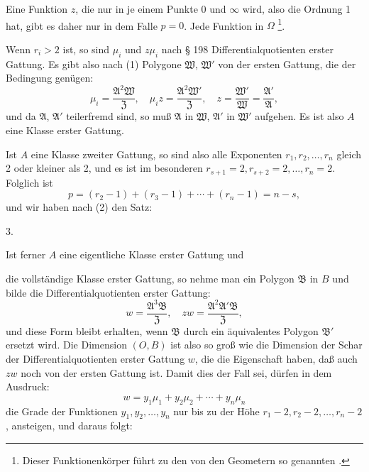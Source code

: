 Eine Funktion $z$, die nur in je einem Punkte 0 und $\infty$ wird,
also die Ordnung 1 hat, gibt es daher nur in dem Falle $p = 0$.
Jede Funktion in $\Omega$ %
\footnote{Dieser Funktionenkörper führt zu den von den Geometern so
genannten \glqq {}\grqq{}.}.

Wenn $r_i > 2$ ist, so sind $\mu_i$ und $z\mu_i$ nach § 198 Differentialquotienten
 erster Gattung. Es gibt also nach (1) Polygone $\mathfrak{W}$, $\mathfrak{W}'$
von der ersten Gattung, die der Bedingung genügen:
\[
\mu_i = \frac{\mathfrak{A}^2\mathfrak{W}}{\mathfrak{Z}},\quad \mu_i z = \frac{\mathfrak{A}^2\mathfrak{W}'}{\mathfrak{Z}},\quad z = \frac{\mathfrak{W}'}{\mathfrak{W}} = \frac{\mathfrak{A}'}{\mathfrak{A}},
\]
und da $\mathfrak{A}$, $\mathfrak{A}'$ teilerfremd sind, so muß $\mathfrak{A}$ in $\mathfrak{W}$, $\mathfrak{A}'$ in $\mathfrak{W}'$ aufgehen.
Es ist also $A$ eine Klasse erster Gattung.

Ist $A$ eine Klasse zweiter Gattung, so sind also alle Exponenten
 $r_1, r_2, \ldots, r_n$ gleich 2 oder kleiner als 2, und es ist im
besonderen $r_{s+1}=2, r_{s+2}=2, \ldots, r_n=2$. Folglich ist
\[
p = (r_2-1)+(r_3-1)+\cdots+(r_n-1) = n-s,
\]
und wir haben nach (2) den Satz:

3. 


Ist ferner $A$ eine eigentliche Klasse erster Gattung und


die vollständige Klasse erster Gattung, so nehme man ein Polygon $\mathfrak{B}$
in $B$ und bilde die Differentialquotienten erster Gattung:
\[
w = \frac{\mathfrak{A}^3\mathfrak{B}}{\mathfrak{Z}},\quad zw = \frac{\mathfrak{A}^2\mathfrak{A}'\mathfrak{B}}{\mathfrak{Z}},
\]
und diese Form bleibt erhalten, wenn $\mathfrak{B}$ durch ein äquivalentes
Polygon $\mathfrak{B}'$ ersetzt wird. Die Dimension $(O, B)$ ist also so groß
wie die Dimension der Schar der Differentialquotienten erster
Gattung $w$, die die Eigenschaft haben, daß auch $zw$ noch von
der ersten Gattung ist. Damit dies der Fall sei, dürfen in dem
Ausdruck:
\[
w = y_1\mu_1 + y_2\mu_2 + \cdots + y_n\mu_n
\]
die Grade der Funktionen $y_1, y_2, \ldots, y_n$ nur bis zu der Höhe
$r_1-2, r_2-2, \ldots, r_n-2$, ansteigen, und daraus folgt:
